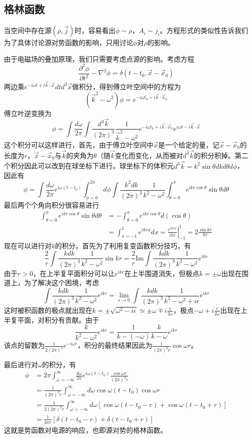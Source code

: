 \documentclass[a4paper,11pt]{ctexart}
\newcommand{\beq}{\begin{equation}}
\newcommand{\eeq}{\end{equation}}
\newcommand{\bea}{\begin{equation}\begin{aligned}}
\newcommand{\eea}{\end{aligned}\end{equation}}
\begin{document}
\subsection{格林函数}
当空间中存在源$(\rho,\vec{j})$时，容易看出$\phi \sim \rho$，$A_i \sim j_i$。方程形式的类似性告诉我们为了具体讨论源对势函数的影响，只用讨论$\phi$对$\rho$的影响。
\par
由于电磁场的叠加原理，我们只需要考虑点源的影响。考虑方程
\beq
\frac{\partial^2 \phi}{\partial t^2} - \nabla^2 \phi = \delta(t-t_0,\vec{x}-\vec{x}_0)
\eeq
两边乘$e^{-i\omega t + i \vec{k} \cdot \vec{x}} dt d^3 \vec{x}$做积分，得到傅立叶空间中的方程为
\beq
(\vec{k}^2 - \omega^2 ) \phi = e^{-i\omega t_0 + i \vec{k} \cdot \vec{x}_0}
\eeq
傅立叶逆变换为
\beq
\phi = \int \frac{d\omega}{2\pi} \int \frac{d^3 \vec{k}}{(2\pi)^3} \frac{1}{\vec{k}^2-\omega^2} e^{-i\omega t_0 + i \vec{k} \cdot \vec{x}_0} e^{i\omega t - i \vec{k} \cdot \vec{x}}
\eeq
这个积分可以这样进行，首先，由于傅立叶空间中$\vec{x}$是一个给定的量，记$\vec{x}-\vec{x}_0$的长度为$r$，$\vec{x}-\vec{x}_0$与$\vec{k}$的夹角为$\theta$（随$\vec{k}$变化而变化，从而被对$d^3 \vec{k}$的积分积掉。第二个积分因此可以改到在球坐标下进行。球坐标下的体积元$d^3 \vec{k} = k^2 \sin \theta dk d\theta d\phi$，因此有
\beq
\phi = \int \frac{d\omega}{2\pi} e^{i\omega ( t - t_0)} \int_{\phi = 0}^{2\pi} d\phi\int \frac{k^2 dk}{(2\pi)^3} \frac{1}{k^2 - \omega^2} \int_{\theta = 0}^\pi e^{ikr\cos \theta } \sin \theta d\theta 
\eeq
最后两个个角向积分很容易进行
\bea
\int_{\theta = 0}^\pi e^{ikr \cos \theta} \sin \theta d\theta &= -\int_{\theta = 0}^{\pi} e^{ikr \cos \theta} d(\cos \theta) \\
&= \int_{x = -1}^1 e^{ikrx}dx = \left. \frac{e^{ikrx}}{ikr} \right|_{-1}^1 = 2\frac{\sin kr}{kr}
\eea
现在可以进行对$k$的积分，首先为了利用复变函数积分技巧，有
\beq
\frac{2}{r} \int \frac{k dk}{(2\pi)^3} \frac{1}{k^2 - \omega^2}\sin kr = \frac{2}{r} \mathrm{Im} \int \frac{k dk}{(2\pi)^3} \frac{1}{k^2 - \omega^2} e^{ikr} 
\eeq
由于$r>0$，在上半复平面积分可以让$e^{ikr}$在上半围道消失，但极点$k = \pm \omega$出现在围道上，为了解决这个困境，考虑
\beq
\int \frac{k dk}{(2\pi)^3} \frac{1}{k^2 - \omega^2} e^{ikr}  = \lim_{\epsilon \to 0} \int \frac{k dk}{(2\pi)^3} \frac{1}{k^2 - \omega^2 + i \epsilon} e^{ikr} 
\eeq
这时被积函数的极点就出现在$k = \pm \sqrt{\omega^2 - i\epsilon} \simeq \pm \omega \mp i\frac{\epsilon}{2\omega}$，极点$-\omega + i \frac{\epsilon}{2\omega} $出现在上半复平面，对积分有贡献。由于
\beq
\frac{k}{k^2 - \omega^2} e^{ikr} = \frac{1}{k-(-\omega)} \frac{k}{k-\omega}e^{ikr}
\eeq
该点的留数为$\frac{1}{2(2\pi)^3} e^{-i\omega r}$，积分的最终结果因此为$\frac{1}{(2\pi)^2 r} \cos \omega r$。\par
最后进行对$\omega$的积分，有
\bea
\phi &= 2\pi \int_{\omega = -\infty}^\infty \frac{d\omega}{2\pi} e^{i\omega (t-t_0) }\frac{ \cos \omega r }{(2\pi)^2r} \\
& = \frac{1}{(2\pi)^2 r}  \int_{\omega = -\infty}^\infty d\omega \cos \omega(t-t_0) \cos \omega r \\
&= \frac{1}{2(2\pi)^2 r} \int_{\omega = -\infty}^\infty d\omega \left[ \cos \omega(t-t_0 -r) + \cos \omega(t-t_0 + r)\right] \\
&= \frac{1}{4 \pi r} \left[\delta (t-t_0-r) + \delta (t-t_0+r) \right]
\eea
这就是势函数对电源的响应，也即源对势的格林函数。
\end{document}
